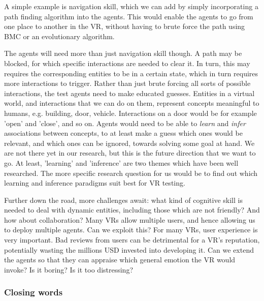 \documentclass[sigplan]{acmart}\settopmatter{printfolios=false,printccs=false,printacmref=false}
\begin{document}
A simple example is navigation skill, which we can add by simply incorporating a path finding algorithm \cite{cui2011based}
into the agents. This would enable the agents to go from one place
to another in the VR, without having to brute force the path using BMC or an evolutionary algorithm.

The agents will need more than just navigation skill though. A path may be blocked, for which
specific interactions are needed to clear it. In turn, this may requires the corresponding entities to be
in a certain state, which in turn requires more interactions to trigger. Rather than just brute
forcing all sorts of possible interactions, the test agents need to make educated guesses.
Entities in a virtual world, and interactions that we can do on them, 
represent concepts meaningful to humans, e.g. building, door, vehicle. Interactions on a door
would be for example 'open' and 'close', and so on. Agents would need to be able to {\em learn} and {\em infer} associations between concepts, to at least make a guess which ones would be relevant,
and which ones can be ignored, towards solving some goal at hand. We are not there yet in our research,
but this is the future direction that we want to go. At least, 'learning' and 'inference' are two themes
which have been well researched. The more specific research question for us would be to find out which
learning and inference paradigms suit best for VR testing.

Further down the road, more challenges await:
what kind of cognitive skill is needed to deal with dynamic entities, including those which are
not friendly? And how about collaboration? Many VRs allow multiple users, and hence allowing us
to deploy multiple agents. Can we exploit this? 
For many VRs, user experience is very important.
Bad reviews from users can be detrimental for a VR's reputation, potentially wasting the
millions USD invested into developing it. Can we extend the agents so that they can appraise
which general emotion the VR would invoke? Is it boring? Is it too distressing?


\subsubsection*{Closing words}
\end{document}
